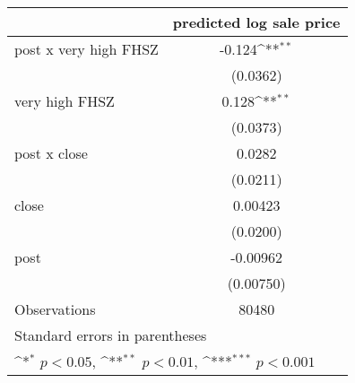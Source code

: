 {
\def\sym#1{\ifmmode^{#1}\else\(^{#1}\)\fi}
\begin{tabular}{l*{1}{c}}
\hline\hline
                    &\multicolumn{1}{c}{predicted log sale price}\\
\hline
post x very high FHSZ&      -0.124\sym{**} \\
                    &    (0.0362)         \\
[1em]
very high FHSZ      &       0.128\sym{**} \\
                    &    (0.0373)         \\
[1em]
post x close        &      0.0282         \\
                    &    (0.0211)         \\
[1em]
close               &     0.00423         \\
                    &    (0.0200)         \\
[1em]
post                &    -0.00962         \\
                    &   (0.00750)         \\
\hline
Observations        &       80480         \\
\hline\hline
\multicolumn{2}{l}{\footnotesize Standard errors in parentheses}\\
\multicolumn{2}{l}{\footnotesize \sym{*} \(p<0.05\), \sym{**} \(p<0.01\), \sym{***} \(p<0.001\)}\\
\end{tabular}
}
